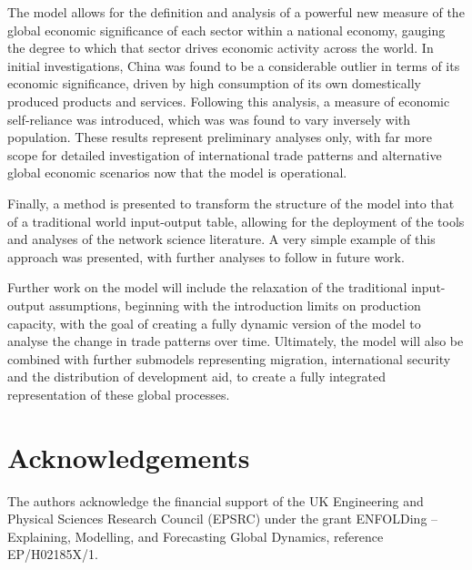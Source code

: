 \documentclass[a4paper]{article}
\begin{document}
The model allows for the definition and analysis of a powerful new measure of the global economic significance of each sector within a national economy, gauging the degree to which that sector drives economic activity across the world. In initial investigations, China was found to be a considerable outlier in terms of its economic significance, driven by high consumption of its own domestically produced products and services. Following this analysis, a measure of economic self-reliance was introduced, which was was found to vary inversely with population. These results represent preliminary analyses only, with far more scope for detailed investigation of international trade patterns and alternative global economic scenarios now that the model is operational.

Finally, a method is presented to transform the structure of the model into that of a traditional world input-output table, allowing for the deployment of the tools and analyses of the network science literature. A very simple example of this approach was presented, with further analyses to follow in future work.

Further work on the model will include the relaxation of the traditional input-output assumptions, beginning with the introduction limits on production capacity, with the goal of creating a fully dynamic version of the model to analyse the change in trade patterns over time. Ultimately, the model will also be combined with further submodels representing migration, international security and the distribution of development aid, to create a fully integrated representation of these global processes.






\section*{Acknowledgements}

The authors acknowledge the financial support of the UK Engineering and Physical Sciences Research Council (EPSRC) under the grant ENFOLDing -- Explaining, Modelling, and Forecasting Global Dynamics, reference EP/H02185X/1. 



\printbibliography
\end{document}

